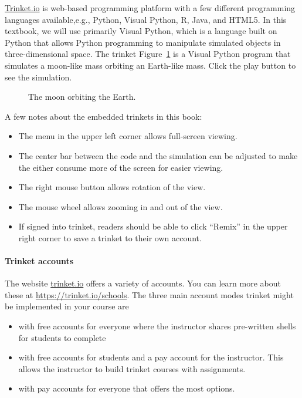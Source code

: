 \href{http://Trinket.io}{Trinket.io} is web-based programming platform with a few different programming languages available,e.g., Python, Visual Python, R, Java, and HTML5. In this textbook, we will use primarily Visual Python, which is a language built on Python that allows Python programming to manipulate simulated objects in three-dimensional space. The trinket Figure~\ref{app:visualpython:earthmoonorbit} is a Visual Python program that simulates a moon-like mass orbiting an Earth-like mass. Click the play button to see the simulation.

\begin{figure}[!htbp]
\centering
\caption[]{The moon orbiting the Earth.}
\label{app:visualpython:earthmoonorbit}
\end{figure}

A few notes about the embedded trinkets in this book:

\begin{itemize}
\item The menu in the upper left corner allows full-screen viewing.
\item The center bar between the code and the simulation can be adjusted to make the either consume more of the screen for easier viewing.
\item The right mouse button allows rotation of the view.
\item The mouse wheel allows zooming in and out of the view.
\item If signed into trinket, readers should be able to click ``Remix'' in the upper right corner to save a trinket to their own account.
\end{itemize}

\paragraph{Trinket accounts}

The website \href{http://trinket.io}{trinket.io} offers a variety of accounts. You can learn more about these at \href{https://trinket.io/schools}{https://trinket.io/schools}. The three main account modes trinket might be implemented in your course are

\begin{itemize}
\item with free accounts for everyone where the instructor shares pre-written shells for students to complete
\item with free accounts for students and a pay account for the instructor. This allows the instructor to build trinket courses with assignments.
\item with pay accounts for everyone that offers the most options.
\end{itemize}

